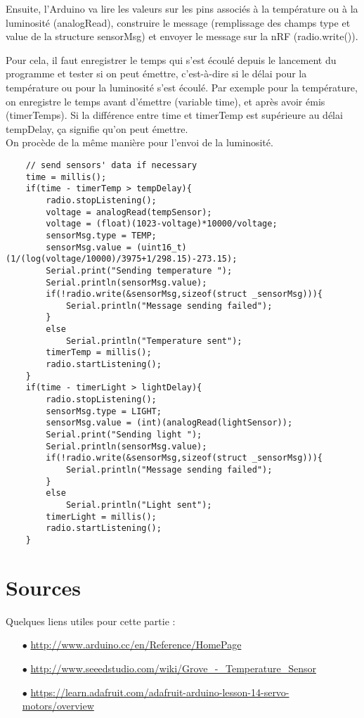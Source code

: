 Ensuite, l'Arduino va lire les valeurs sur les pins associés à la température ou à la
luminosité (analogRead), construire le message (remplissage des champs type et value
de la structure sensorMsg) et envoyer le message sur la nRF (radio.write()).

Pour cela, il faut enregistrer le temps qui s'est écoulé depuis le lancement du programme
et tester si on peut émettre, c'est-à-dire si le délai pour la température ou pour la
luminosité s'est écoulé. Par exemple pour la température, on enregistre le temps avant 
d'émettre (variable time), et après avoir émis (timerTemps). 
Si la différence entre time et timerTemp est supérieure au délai tempDelay, ça signifie qu'on
peut émettre.\\

On procède de la même manière pour l'envoi de la luminosité.

\bigbreak
\begin{DDbox}{\linewidth}
\begin{lstlisting}
	// send sensors' data if necessary
	time = millis();
	if(time - timerTemp > tempDelay){
		radio.stopListening();
		voltage = analogRead(tempSensor);
		voltage = (float)(1023-voltage)*10000/voltage;
		sensorMsg.type = TEMP;
		sensorMsg.value = (uint16_t)(1/(log(voltage/10000)/3975+1/298.15)-273.15);
		Serial.print("Sending temperature ");
		Serial.println(sensorMsg.value);
		if(!radio.write(&sensorMsg,sizeof(struct _sensorMsg))){
			Serial.println("Message sending failed");
		}
		else
			Serial.println("Temperature sent");
		timerTemp = millis();
		radio.startListening();   
	}
	if(time - timerLight > lightDelay){
		radio.stopListening();
		sensorMsg.type = LIGHT;
		sensorMsg.value = (int)(analogRead(lightSensor));
		Serial.print("Sending light ");
		Serial.println(sensorMsg.value);
		if(!radio.write(&sensorMsg,sizeof(struct _sensorMsg))){
			Serial.println("Message sending failed");
		}
		else
			Serial.println("Light sent");
		timerLight = millis();
		radio.startListening();
	}

\end{lstlisting}
\end{DDbox}

\section{Sources}
Quelques liens utiles pour cette partie :
\begin{itemize}
\item[$\bullet$] \url{http://www.arduino.cc/en/Reference/HomePage}
\item[$\bullet$] \url{http://www.seeedstudio.com/wiki/Grove_-_Temperature_Sensor}
\item[$\bullet$] \url{https://learn.adafruit.com/adafruit-arduino-lesson-14-servo-motors/overview}
\end{itemize}
